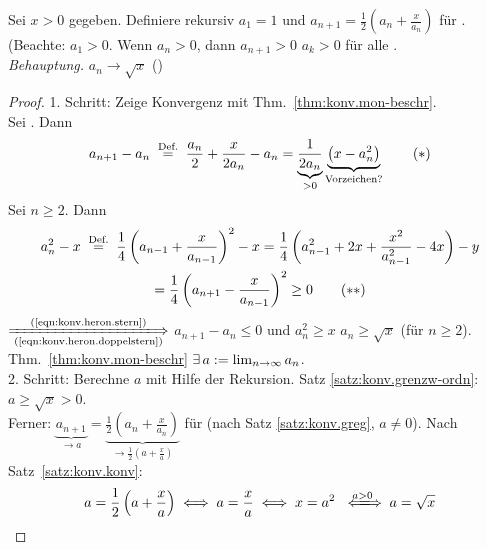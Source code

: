 \documentclass[12pt]{scrreprt}
\begin{document}
\begin{bsp}
  \label{bsp:konv.heron}
  Sei $x>0$ gegeben. Definiere rekursiv $a_1=1$ und
  $\displaystyle a_{n+1}=\frac12(a_n+\frac{x}{a_n})$ für . (Beachte:
  $a_1>0$. Wenn $a_n>0$, dann $a_{n+1}>0$  $a_k>0$
  für alle .  \\\emph{Behauptung.} $a_n\to\sqrt{x}$ (\ninf)
  \begin{proof}
    1. Schritt: Zeige Konvergenz mit Thm.~\ref{thm:konv.mon-beschr}.\\
    Sei . Dann
    \begin{equation} \label{eqn:konv.heron.stern} a_{n+1}-a_n
      \nach{=}{Def.} \frac{a_n}{2} + \frac{x}{2a_n}-a_n =
      \underbrace{\frac{1}{2a_n}}_{>0}
      \underbrace{\left(x-a_n^2\right)}_{\text{Vorzeichen?}}
      \tag{$*$} \end{equation} Sei $n\ge2$. Dann
    \begin{multline*} \label{eqn:konv.heron.doppelstern} a_n^2 - x
      \nach{=}{Def.} \frac14 \left( a_{n-1} + \frac{x}{a_{n-1}}
      \right)^2 - x = \frac14 \left( a_{n-1}^2 + 2x +
        \frac{x^2}{a_{n-1}^2} - 4x\right) - y \\= \frac14 \left(
        a_{n+1} - \frac{x}{a_{n-1}} \right)^2 \ge 0
      \tag{$**$} \end{multline*}
    $\xLongrightarrow[\text{(\ref{eqn:konv.heron.doppelstern})}]{\text{(\ref{eqn:konv.heron.stern})}}$
    $a_{n+1}-a_n \le 0$ und $a_n^2 \ge x$
    \folgtnach{\ref{satz:zahlen.potenzen}} $a_n \ge \sqrt{x}$ (für
    $n\ge2$).\\Thm.~\ref{thm:konv.mon-beschr} \folgt
    $\exists\,a:=\lim_{n\rightarrow\infty}{a_n}$.\\
    2. Schritt: Berechne $a$ mit Hilfe der Rekursion. Satz
    \ref{satz:konv.grenzw-ordn}: $a \ge \sqrt{x} > 0$.\\Ferner:
    $\underbrace{a_{n+1}}_{\to
      a}=\underbrace{\frac12\left(a_n+\frac{x}{a_n}\right)}_{\to
      \frac12\left(a+\frac{x}{a}\right)}$ für \ninf (nach Satz
    \ref{satz:konv.greg}, $a\ne0$). Nach Satz~\ref{satz:konv.konv}:
    \[a = \frac12\left(a+\frac{x}{a}\right) \gdw a = \frac{x}{a} \gdw
    x = a^2 \gdwwegen{a>0} a = \sqrt{x}\]
  \end{proof}
\end{bsp}
\end{document}
